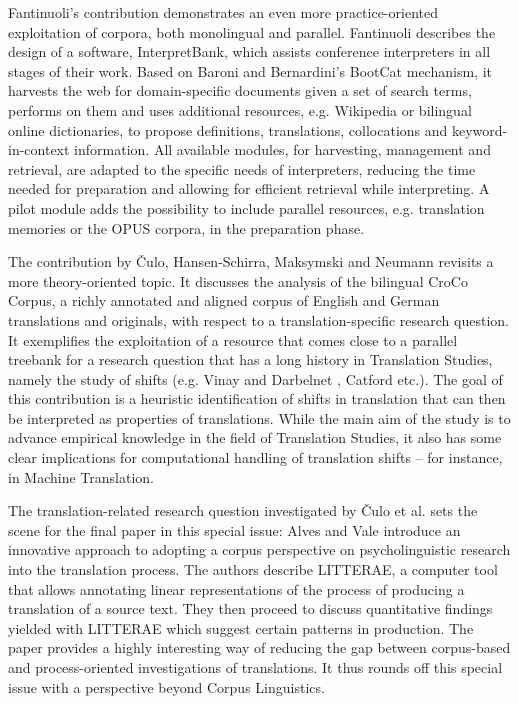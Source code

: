 \documentclass[output=paper]{LSP/langsci}
\begin{document}
\largerpage
Fantinuoli's contribution demonstrates an even more practice-oriented exploitation of corpora, both monolingual and parallel. Fantinuoli describes the design of a software, InterpretBank, which assists conference interpreters in all stages of their work. Based on Baroni and Bernardini's \citet{Baroni2004} BootCat mechanism, it harvests the web for domain-specific documents given a set of search terms, performs  on them and uses additional resources, e.g. Wikipedia or bilingual online dictionaries, to propose definitions, translations, collocations and keyword-in-context information. All available modules, for harvesting, management and retrieval, are adapted to the specific needs of interpreters, reducing the time needed for preparation and allowing for efficient retrieval while interpreting. A pilot module adds the possibility to include parallel resources, e.g. translation memories or the OPUS corpora, in the preparation phase.

The contribution by Čulo, Hansen-Schirra, Maksymski and Neumann revisits a more theory-oriented topic. It discusses the analysis of the bilingual CroCo Corpus, a richly annotated and aligned corpus of English and German translations and originals, with respect to a translation-specific research question. It exemplifies the exploitation of a resource that comes close to a parallel treebank for a research question that has a long history in Translation Studies, namely the study of shifts (e.g. Vinay and Darbelnet \citealt{Vinay1958}, Catford \citealt{Catford1965} etc.). The goal of this contribution is a heuristic identification of shifts in translation that can then be interpreted as properties of translations. While the main aim of the study is to advance empirical knowledge in the field of Translation Studies, it also has some clear implications for computational handling of translation shifts -- for instance, in Machine Translation.

The translation-related research question investigated by Čulo et al. sets the scene for the final paper in this special issue: Alves and Vale introduce an innovative approach to adopting a corpus perspective on psycholinguistic research into the translation process. The authors describe LITTERAE, a computer tool that allows annotating linear representations of the process of producing a translation of a source text. They then proceed to discuss quantitative findings yielded with LITTERAE which suggest certain patterns in  production. The paper provides a highly interesting way of reducing the gap between corpus-based and process-oriented investigations of translations. It thus rounds off this special issue with a perspective beyond Corpus Linguistics.
\end{document}
